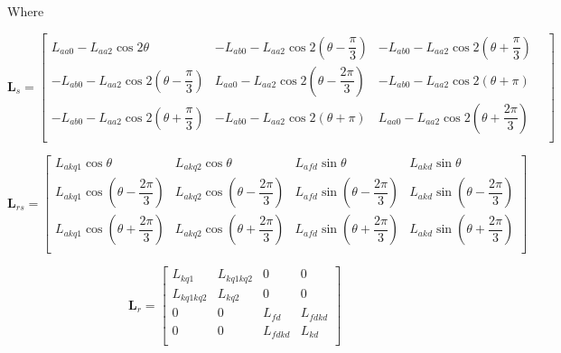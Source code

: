 Where

\begin{equation}
	\mathbf{L}_s
	=
	\begin{bmatrix}
		L_{aa0} - L_{aa2} \cos 2 \theta &
		-L_{ab0} - L_{aa2} \cos 2(\theta - \dfrac{\pi}{3}) &
		-L_{ab0} - L_{aa2}\cos 2(\theta + \dfrac{\pi}{3}) &\\[6pt]
		-L_{ab0} - L_{aa2} \cos 2(\theta - \dfrac{\pi}{3}) &
		L_{aa0} - L_{aa2} \cos 2(\theta - \dfrac{2 \pi}{3})&
		-L_{ab0} - L_{aa2}\cos 2(\theta + \pi) \\[6pt]
		-L_{ab0} - L_{aa2} \cos 2(\theta + \dfrac{\pi}{3}) &
		-L_{ab0} - L_{aa2} \cos 2(\theta + \pi)&
		L_{aa0} - L_{aa2}\cos 2(\theta + \dfrac{2 \pi}{3}) \\[6pt]
	\end{bmatrix}
\end{equation}

\begin{equation}
	\mathbf{L}_{rs}
	=
	\begin{bmatrix}
		L_{akq1} \cos \theta &
		L_{akq2} \cos \theta &
		L_{afd} \sin \theta &
		L_{akd} \sin \theta \\[6pt]
		L_{akq1} \cos (\theta - \dfrac{2 \pi}{3}) &
		L_{akq2} \cos (\theta - \dfrac{2 \pi}{3}) &
		L_{afd} \sin (\theta - \dfrac{2 \pi}{3}) &
		L_{akd} \sin (\theta - \dfrac{2 \pi}{3}) \\[6pt]
		L_{akq1} \cos (\theta + \dfrac{2 \pi}{3}) &
		L_{akq2} \cos (\theta + \dfrac{2 \pi}{3}) &
		L_{afd} \sin (\theta + \dfrac{2 \pi}{3}) &
		L_{akd} \sin (\theta + \dfrac{2 \pi}{3}) \\[6pt]
	\end{bmatrix}
\end{equation}

\begin{equation}
	\mathbf{L}_r
	=
	\begin{bmatrix}
		L_{kq1} & L_{kq1kq2} & 0 & 0 \\  
		L_{kq1kq2} & L_{kq2} & 0 & 0 \\ 
		0 & 0 & L_{fd} & L_{fdkd} \\
		0 & 0 & L_{fdkd} & L_{kd} \\  
	\end{bmatrix}
\end{equation}

